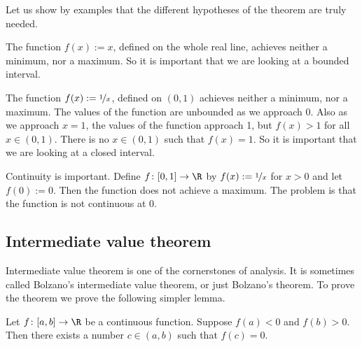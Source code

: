 \documentclass[12pt]{book}
\begin{document}
Let us show by examples that the different hypotheses of the theorem are
truly needed.

\begin{example}
The function $f(x) := x$, defined on the whole real line,
achieves neither a minimum, nor a maximum.
So it is important that
we are looking at a bounded interval.
\end{example}

\begin{example}
The function $f(x) := \nicefrac{1}{x}$, defined on $(0,1)$ 
achieves neither a minimum, nor a maximum.
The values of the function are
unbounded as we approach 0.
Also as we approach $x=1$, the values of the
function approach 1, but $f(x) > 1$ for all $x \in (0,1)$.
There is
no $x \in (0,1)$ such that $f(x) = 1$.
So it is important that
we are looking at a closed interval.
\end{example}

\begin{example}
Continuity is important.
Define $f \colon [0,1] \to \R$ by 
$f(x) := \nicefrac{1}{x}$ for $x > 0$ and let $f(0) := 0$.
Then
the function does not achieve a maximum.
The problem is that
the function is not continuous at 0.
\end{example}

\subsection*{Intermediate value theorem}

Intermediate value theorem is one of the cornerstones of analysis.
It is sometimes called Bolzano's intermediate value theorem, or just Bolzano's theorem.
To prove the theorem we prove the following simpler lemma.

\begin{lemma} \label{IVT:lemma}
Let $f \colon [a,b] \to \R$ be a continuous function.
Suppose $f(a) < 0$ and $f(b) > 0$. 
Then there exists a number $c \in (a,b)$
such that $f(c) = 0$.
\end{lemma}
\end{document}
